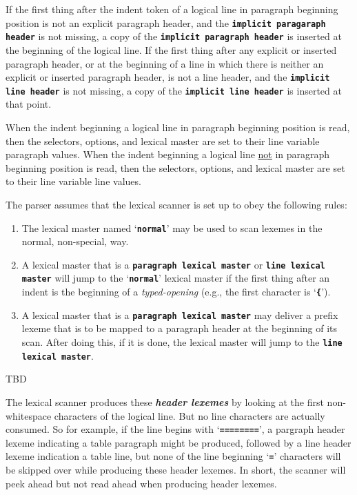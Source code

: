 \documentclass[12pt]{article}
\makeatletter
\newcommand{\TT}[1]{{\tt \bfseries #1}}
\newcommand{\skey}[2]{{\bf \em #1#2}\index{#1}}
\newcommand{\ttmkey}[2]{\TT{#1}\index{#1@{\tt #1}!#2}}
\makeatother
\begin{document}
If the first thing after the indent token of a logical line
in paragraph beginning position is not an explicit paragraph header,
and the \TT{implicit paragaraph header} is not missing, a copy
of the \TT{implicit paragraph header} is inserted at the beginning of
the logical line.  If the first thing after any explicit or inserted
paragraph header, or at the beginning of a line in which there
is neither an explicit or inserted paragraph header, is not a line
header, and the \TT{implicit line header} is not missing, a copy
of the \TT{implicit line header} is inserted at that point.

When the indent beginning a logical line in paragraph beginning position
is read, then the selectors, options, and lexical master are set to
their line variable paragraph values.\label{SETTINGS-AFTER-INDENT}
When the indent beginning a logical line \underline{not}
in paragraph beginning position
is read, then the selectors, options, and lexical master are set to
their line variable line values.

The parser assumes that the lexical scanner is set up to obey
the following rules:
\begin{enumerate}
\item The lexical master named `\ttmkey{normal}{lexical master}'
may be used to scan lexemes in the normal, non-special, way.

\item A lexical master that is a \TT{paragraph lexical master}
or \TT{line lexical master}
will jump to the `\TT{normal}' lexical master if the first thing after
an indent is the beginning of a {\em typed-opening} (e.g., the
first character is `\TT{\{}').

\item A lexical master that is a \TT{paragraph lexical master}
may deliver a prefix lexeme that is to be mapped to a paragraph header
at the beginning of its scan.  After doing this, if it is done,
the lexical master will jump to the \TT{line lexical master}.

\end{enumerate}

TBD

The lexical scanner produces these \skey{header lexeme}s by looking
at the first non-whitespace characters of the logical line.  But no
line characters are actually consumed.  So for example, if the
line begins with `\TT{========}', a pargraph header lexeme indicating
a table paragraph might be produced, followed by a line header lexeme
indication a table line, but none of the line beginning `\TT{=}'
characters will be skipped over while producing these header lexemes.
In short, the scanner will peek ahead but not read ahead when
producing header lexemes.
\end{document}
